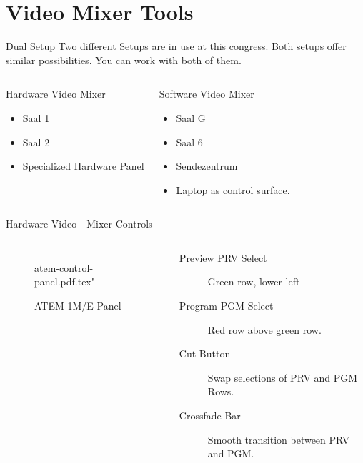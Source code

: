 \documentclass[aspectratio=169]{beamer}
\begin{document}
\section{Video Mixer Tools}

\begin{frame}{Dual Setup}
	Two different Setups are in use at this congress. 
	Both setups offer similar possibilities. 
	You can work with both of them.

	\begin{columns}[T,onlytextwidth]
		\begin{exampleblock}{Hardware Video Mixer}
			\begin{itemize}
				\item Saal 1
				\item Saal 2
				\item Specialized Hardware Panel
			\end{itemize}
		\end{exampleblock}

		\begin{exampleblock}{Software Video Mixer}
			\begin{itemize}
				\item Saal G
				\item Saal 6
				\item Sendezentrum
				\item Laptop as control surface.
			\end{itemize}
		\end{exampleblock}
	\end{columns}

\end{frame}

\begin{frame}{Hardware Video - Mixer Controls}
	\begin{columns}[T,onlytextwidth]
	\begin{figure} 
		\centering
		\def\svgwidth{0.9\textwidth}
		{atem-control-panel.pdf.tex"}
		\caption{ATEM 1M/E Panel}
		\label{fig:1me1}
	\end{figure}
	\begin{description}
		\item[Preview PRV Select] Green row, lower left 
		\item[Program PGM Select] Red row above green row.
		\item[Cut Button] Swap selections of PRV and PGM Rows.
		\item[Crossfade Bar] Smooth transition between PRV and PGM.
     \end{description}
	\end{columns}
\end{frame}
\end{document}
